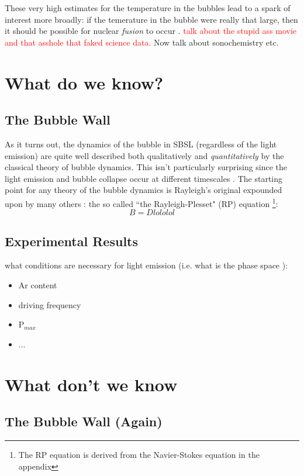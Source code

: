 \documentclass[rmp,aps,nofootinbib,superscriptaddress,floatfix]{revtex4-2}
\begin{document}
These very high estimates for the temperature in the bubbles lead to a spark of interest more broadly: if the temerature in the bubble were really that large, then it should be possible for nuclear \emph{fusion} to occur \cite{}. \textcolor{red}{ talk about the stupid ass movie and that asshole that faked science data.} 
Now talk about sonochemistry etc.




\section{What do we know?}
\subsection{The Bubble Wall}
As it turns out, the dynamics of the bubble in SBSL (regardless of the light emission) are quite well described both qualitatively and \emph{quantitatively} by the classical theory of bubble dynamics. This isn't particularly surprising since the light emission and bubble collapse occur at different timescales \cite{}. The starting point for any theory of the bubble dynamics is Rayleigh's original expounded upon by many others \cite{}: the so called ``the Rayleigh-Plesset" (RP) equation \footnote{The RP equation is derived from the Navier-Stokes equation in the appendix}:
\begin{equation}
B=D lololol
\label{eq:RP}
\end{equation}


\subsection{Experimental Results}
what conditions are necessary for light emission (i.e. what is the phase space \cite{lohse2018bubble}):
\begin{itemize}
    \item Ar content
    \item driving frequency
    \item P$_{max}$
    \item ...
\end{itemize}

\section{What don't we know}
\subsection{The Bubble Wall (Again)}
\end{document}
